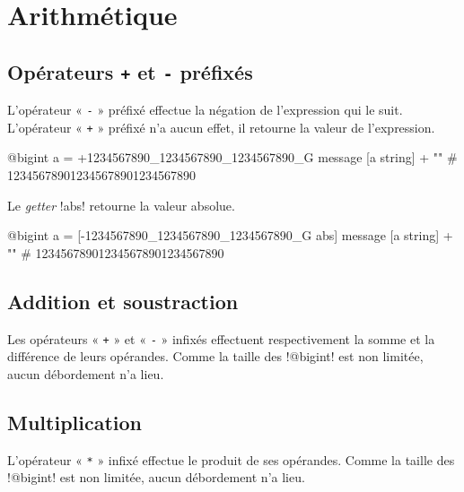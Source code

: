 \section{Arithmétique}


\subsection{Opérateurs \texttt{+} et \texttt{-} préfixés}

L'opérateur « \texttt{-} » préfixé effectue la négation de l'expression qui le suit. L'opérateur « \texttt{+} » préfixé n'a aucun effet, il retourne la valeur de l'expression.

\begin{galgas}
@bigint a = +1234567890_1234567890_1234567890_G
message [a string] + "\n" # 123456789012345678901234567890
\end{galgas}










Le \emph{getter} \ggs!abs! retourne la valeur absolue.

\begin{galgas}
@bigint a = [-1234567890_1234567890_1234567890_G abs]
message [a string] + "\n" # 123456789012345678901234567890
\end{galgas}






\subsection{Addition et soustraction}

Les opérateurs « \texttt{+} » et « \texttt{-} » infixés effectuent respectivement la somme et la différence de leurs opérandes. Comme la taille des \ggs!@bigint! est non limitée, aucun débordement n'a lieu.



\subsection{Multiplication}

L'opérateur « \texttt{*} » infixé effectue le produit de ses opérandes. Comme la taille des \ggs!@bigint! est non limitée, aucun débordement n'a lieu.




